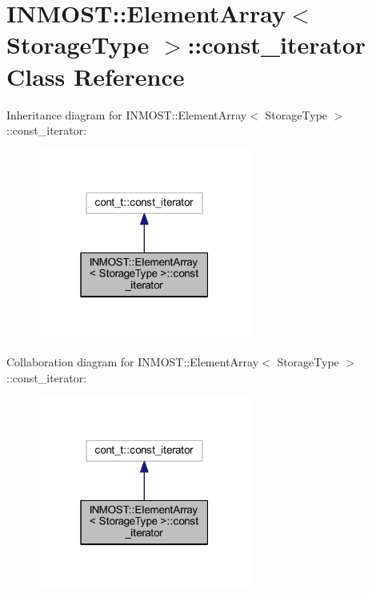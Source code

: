 \hypertarget{classINMOST_1_1ElementArray_1_1const__iterator}{\section{I\-N\-M\-O\-S\-T\-:\-:Element\-Array$<$ Storage\-Type $>$\-:\-:const\-\_\-iterator Class Reference}
\label{classINMOST_1_1ElementArray_1_1const__iterator}
}


Inheritance diagram for I\-N\-M\-O\-S\-T\-:\-:Element\-Array$<$ Storage\-Type $>$\-:\-:const\-\_\-iterator\-:\nopagebreak
\begin{figure}[H]
\begin{center}
\leavevmode
\includegraphics[width=199pt]{classINMOST_1_1ElementArray_1_1const__iterator__inherit__graph}
\end{center}
\end{figure}


Collaboration diagram for I\-N\-M\-O\-S\-T\-:\-:Element\-Array$<$ Storage\-Type $>$\-:\-:const\-\_\-iterator\-:\nopagebreak
\begin{figure}[H]
\begin{center}
\leavevmode
\includegraphics[width=199pt]{classINMOST_1_1ElementArray_1_1const__iterator__coll__graph}
\end{center}
\end{figure}
